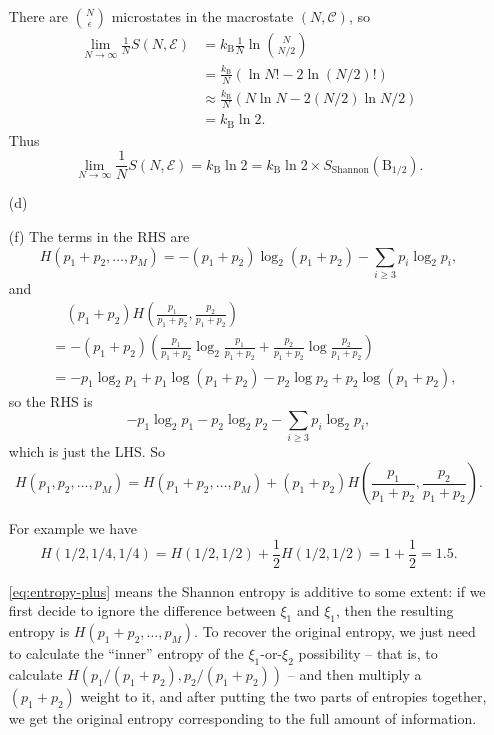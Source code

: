 \documentclass[hyperref, a4paper]{article}
\begin{document}
\begin{itemize}
There are $\binom{N}{\epsilon}$ microstates in the macrostate $(N ,\mathcal{C})$,
so 
\[
    \begin{aligned}
        \lim_{N \to \infty} \frac{1}{N} S(N, \mathcal{E}) &= k_{\text{B}} \frac{1}{N} \ln \binom{N}{N / 2} \\
        &= \frac{k_{\text{B}}}{N} (\ln N! - 2 \ln (N/2)!) \\
        &\approx \frac{k_{\text{B}}}{N} (N \ln N - 2 (N / 2) \ln N/2 ) \\
        &= k_{\text{B}} \ln 2.
    \end{aligned}
\]
Thus 
\begin{equation}
    \lim_{N \to \infty} \frac{1}{N} S(N, \mathcal{E}) = k_{\text{B}} \ln 2 = k_{\text{B}} \ln 2 \times S_{\text{Shannon}} (\mathrm{B}_{1/2}).
\end{equation}

\item[(d)] 

\item[(f)] The terms in the RHS are
\[
    H(p_1 + p_2, \ldots, p_M) = - (p_1 + p_2) \log_2 (p_1 + p_2) - \sum_{i \geq 3} p_i \log_2 p_i,
\]
and 
\[
    \begin{aligned}
        &\quad (p_1 + p_2) H\left( \frac{p_1}{p_1 + p_2}, \frac{p_2}{p_1 + p_2} \right) \\
        &= - (p_1 + p_2) \left( \frac{p_1}{p_1 + p_2} \log_2 \frac{p_1}{p_1 + p_2}  
        + \frac{p_2}{p_1 + p_2} \log \frac{p_2}{p_1 + p_2} \right) \\
        &= - p_1 \log_2 p_1 + p_1 \log (p_1 + p_2) - p_2 \log p_2 + p_2 \log (p_1 + p_2),
    \end{aligned}
\]
so the RHS is 
\[
    - p_1 \log_2 p_1 - p_2 \log_2 p_2 - \sum_{i \geq 3} p_i \log_2 p_i,
\]
which is just the LHS. So 
\begin{equation}
    H(p_1, p_2, \ldots, p_M) = H(p_1 + p_2, \ldots, p_M) + (p_1 + p_2) H\left( \frac{p_1}{p_1 + p_2}, \frac{p_2}{p_1 + p_2} \right).
    \label{eq:entropy-plus}
\end{equation}

For example we have 
\begin{equation}
    H(1/2, 1/4, 1/4) = H(1/2, 1/2) + \frac{1}{2} H(1/2, 1/2) = 1 + \frac{1}{2} = 1.5.
\end{equation}

\eqref{eq:entropy-plus} means the Shannon entropy is additive to some extent:
if we first decide to ignore the difference between $\xi_1$ and $\xi_1$,
then the resulting entropy is $H(p_1 + p_2, \ldots, p_M)$.
To recover the original entropy,
we just need to calculate the ``inner'' entropy of the $\xi_1$-or-$\xi_2$ possibility -- 
that is, to calculate $H(p_1 / (p_1 + p_2), p_2 / (p_1 + p_2))$ --
and then multiply a $(p_1 + p_2)$ weight to it,
and after putting the two parts of entropies together, 
we get the original entropy corresponding to the full amount of information.


\end{itemize}
\end{document}

